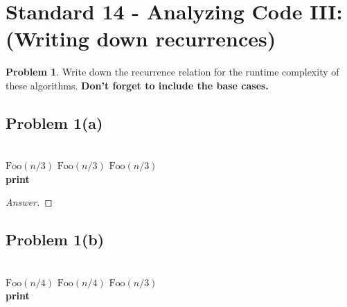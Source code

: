 \documentclass[11pt]{article}
\theoremstyle{definition}
\theoremstyle{definition}
\newtheorem{required}{Problem}
\theoremstyle{definition}
\begin{document}
\newpage
\section{Standard 14 - Analyzing Code III: (Writing down recurrences)}

\begin{required} \label{Recursive1}
Write down the recurrence relation for the runtime complexity of these algorithms. \textbf{Don't forget to include the base cases.}

\subsection{Problem 1(a)}

\begin{algorithm}
\caption{Writing Recurrences 1}\label{alg:Recurrence1}
\begin{algorithmic}[1]
\Return
\EndIf

\noindent \\
\State $\text{Foo}(n/3)$
\State $\text{Foo}(n/3)$
\State $\text{Foo}(n/3)$ \\

	\State \textbf{print} 
\EndFor
\EndProcedure
\end{algorithmic}
\end{algorithm}

\begin{proof}[Answer]
\end{proof}

\newpage


\subsection{Problem 1(b)}

\begin{algorithm}
\caption{Writing Recurrences 2}\label{alg:Recurrence2}
\begin{algorithmic}[1]
\Return
\EndIf

\noindent \\
\State $\text{Foo}(n/4)$
\State $\text{Foo}(n/4)$
\State $\text{Foo}(n/3)$ \\

	\State \textbf{print} 
\EndFor
\EndProcedure
\end{algorithmic}
\end{algorithm}
\end{required}
\end{document}

